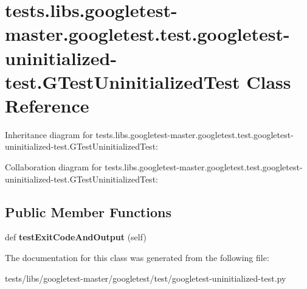 \hypertarget{classtests_1_1libs_1_1googletest-master_1_1googletest_1_1test_1_1googletest-uninitialized-test_1_1GTestUninitializedTest}{}\section{tests.\+libs.\+googletest-\/master.googletest.\+test.\+googletest-\/uninitialized-\/test.G\+Test\+Uninitialized\+Test Class Reference}
\label{classtests_1_1libs_1_1googletest-master_1_1googletest_1_1test_1_1googletest-uninitialized-test_1_1GTestUninitializedTest}


Inheritance diagram for tests.\+libs.\+googletest-\/master.googletest.\+test.\+googletest-\/uninitialized-\/test.G\+Test\+Uninitialized\+Test\+:


Collaboration diagram for tests.\+libs.\+googletest-\/master.googletest.\+test.\+googletest-\/uninitialized-\/test.G\+Test\+Uninitialized\+Test\+:
\subsection*{Public Member Functions}
\begin{DoxyCompactItemize}
\item 
\mbox{\label{classtests_1_1libs_1_1googletest-master_1_1googletest_1_1test_1_1googletest-uninitialized-test_1_1GTestUninitializedTest_a6e14d761257da9fe0ee94efb124c8bc5}} 
def {\bfseries test\+Exit\+Code\+And\+Output} (self)
\end{DoxyCompactItemize}


The documentation for this class was generated from the following file\+:\begin{DoxyCompactItemize}
\item 
tests/libs/googletest-\/master/googletest/test/googletest-\/uninitialized-\/test.\+py\end{DoxyCompactItemize}
